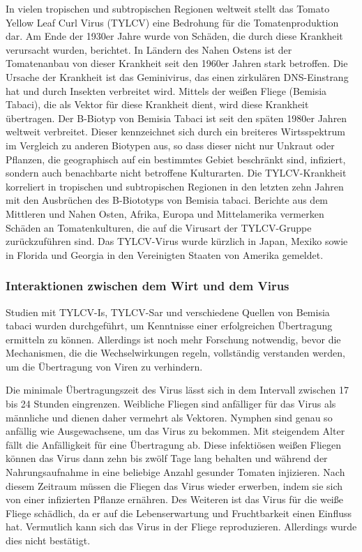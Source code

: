In vielen tropischen und subtropischen Regionen weltweit stellt das Tomato Yellow Leaf Curl Virus (TYLCV) eine Bedrohung für die Tomatenproduktion dar\cite{TYLCV}. Am Ende der 1930er Jahre wurde von Schäden, die durch diese Krankheit verursacht wurden, berichtet. In Ländern des Nahen Ostens ist der Tomatenanbau von dieser Krankheit seit den 1960er Jahren stark betroffen. Die Ursache der Krankheit ist das Geminivirus, das einen zirkulären DNS-Einstrang hat und durch Insekten verbreitet wird\cite{gemini}. Mittels der weißen Fliege (Bemisia Tabaci), die als Vektor für diese Krankheit dient, wird diese Krankheit übertragen. Der B-Biotyp von Bemisia Tabaci ist seit den späten 1980er Jahren weltweit verbreitet. Dieser kennzeichnet sich durch ein breiteres Wirtsspektrum im Vergleich zu anderen Biotypen aus, so dass dieser nicht nur Unkraut oder Pflanzen, die geographisch auf ein bestimmtes Gebiet beschränkt sind\cite{endemic}, infiziert, sondern auch benachbarte nicht betroffene Kulturarten. Die TYLCV-Krankheit korreliert in tropischen und subtropischen Regionen in den letzten zehn Jahren mit den Ausbrüchen des B-Biototyps von Bemisia tabaci. Berichte aus dem Mittleren und Nahen Osten, Afrika, Europa und Mittelamerika vermerken Schäden an Tomatenkulturen, die auf die Virusart der TYLCV-Gruppe zurückzuführen sind. Das TYLCV-Virus wurde kürzlich in Japan, Mexiko sowie in Florida und Georgia in den Vereinigten Staaten von Amerika gemeldet. 

\subsubsection{Interaktionen zwischen dem Wirt und dem Virus}


Studien mit TYLCV-Is, TYLCV-Sar und verschiedene Quellen von Bemisia tabaci wurden durchgeführt, um Kenntnisse einer erfolgreichen Übertragung ermitteln zu können. Allerdings ist noch mehr Forschung notwendig, bevor die Mechanismen, die die Wechselwirkungen regeln, vollständig verstanden werden, um die Übertragung von Viren zu verhindern\cite{TYLCV}. 

Die minimale Übertragungszeit des Virus lässt sich in dem Intervall zwischen 17 bis 24 Stunden eingrenzen\cite{TYLCV}. Weibliche Fliegen sind anfälliger für das Virus als männliche und dienen daher vermehrt als Vektoren. Nymphen sind genau so anfällig wie Ausgewachsene, um das Virus zu bekommen. Mit steigendem Alter fällt die Anfälligkeit für eine Übertragung ab. Diese infektiösen weißen Fliegen können das Virus dann zehn bis zwölf Tage lang behalten und während der Nahrungsaufnahme in eine beliebige Anzahl gesunder Tomaten injizieren. Nach diesem Zeitraum müssen die Fliegen das Virus wieder erwerben, indem sie sich von einer infizierten Pflanze ernähren\cite{leaf_curl}. Des Weiteren ist das Virus für die weiße Fliege schädlich, da er auf die Lebenserwartung und Fruchtbarkeit einen Einfluss hat. Vermutlich kann sich das Virus in der Fliege reproduzieren. Allerdings wurde dies nicht bestätigt.


